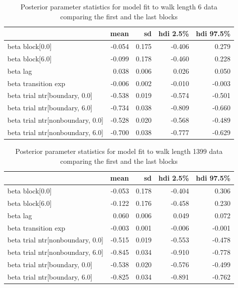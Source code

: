 \begin{table}[H]
    \centering
    \begin{tabular}{lrrrr}
        \toprule
         & mean & sd & hdi 2.5\% & hdi 97.5\% \\
        \midrule
        beta block[0.0] & -0.054 & 0.175 & -0.406 & 0.279 \\
        beta block[6.0] & -0.099 & 0.178 & -0.460 & 0.228 \\
        beta lag & 0.038 & 0.006 & 0.026 & 0.050 \\
        beta transition exp & -0.006 & 0.002 & -0.010 & -0.003 \\
        beta trial ntr[boundary, 0.0] & -0.538 & 0.019 & -0.574 & -0.501 \\
        beta trial ntr[boundary, 6.0] & -0.734 & 0.038 & -0.809 & -0.660 \\
        beta trial ntr[nonboundary, 0.0] & -0.528 & 0.020 & -0.568 & -0.489 \\
        beta trial ntr[nonboundary, 6.0] & -0.700 & 0.038 & -0.777 & -0.629 \\
        \bottomrule
    \end{tabular}
    \caption{Posterior parameter statistics for model fit to walk length 6 data comparing the first and the last blocks}
    \label{tab:first-last-blocks-6}    
    
\end{table}

\begin{table}[H]
    \centering
    \begin{tabular}{lrrrr}
        \toprule
         & mean & sd & hdi 2.5\% & hdi 97.5\% \\
        \midrule
        beta block[0.0] & -0.053 & 0.178 & -0.404 & 0.306 \\
        beta block[6.0] & -0.122 & 0.176 & -0.458 & 0.230 \\
        beta lag & 0.060 & 0.006 & 0.049 & 0.072 \\
        beta transition exp & -0.003 & 0.001 & -0.006 & -0.001 \\
        beta trial ntr[nonboundary, 0.0] & -0.515 & 0.019 & -0.553 & -0.478 \\
        beta trial ntr[nonboundary, 6.0] & -0.845 & 0.034 & -0.910 & -0.778 \\
        beta trial ntr[boundary, 0.0] & -0.538 & 0.020 & -0.576 & -0.499 \\
        beta trial ntr[boundary, 6.0] & -0.825 & 0.034 & -0.891 & -0.762 \\
        \bottomrule
    \end{tabular}        
    \caption{Posterior parameter statistics for model fit to walk length 1399 data comparing the first and the last blocks}
    \label{tab:first-last-blocks-1399}    
\end{table}


